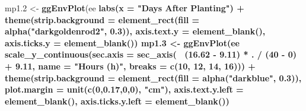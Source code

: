 \documentclass[
]{article}
\newenvironment{Shaded}{\begin{snugshade}}{\end{snugshade}}
\newcommand{\DataTypeTok}[1]{\textcolor[rgb]{0.13,0.29,0.53}{#1}}
\newcommand{\DecValTok}[1]{\textcolor[rgb]{0.00,0.00,0.81}{#1}}
\newcommand{\FloatTok}[1]{\textcolor[rgb]{0.00,0.00,0.81}{#1}}
\newcommand{\KeywordTok}[1]{\textcolor[rgb]{0.13,0.29,0.53}{\textbf{#1}}}
\newcommand{\NormalTok}[1]{#1}
\newcommand{\OperatorTok}[1]{\textcolor[rgb]{0.81,0.36,0.00}{\textbf{#1}}}
\newcommand{\StringTok}[1]{\textcolor[rgb]{0.31,0.60,0.02}{#1}}
\begin{document}
\begin{Shaded}
\begin{Highlighting}[]
{{{\NormalTok{mp1}\FloatTok{.2}\NormalTok{ <-}\StringTok{ }\KeywordTok{ggEnvPlot}\NormalTok{(ee }\OperatorTok{%
\StringTok{  }\KeywordTok{labs}\NormalTok{(}\DataTypeTok{x =} \StringTok{"Days After Planting"}\NormalTok{) }\OperatorTok{+}
\StringTok{  }\KeywordTok{theme}\NormalTok{(}\DataTypeTok{strip.background =} \KeywordTok{element_rect}\NormalTok{(}\DataTypeTok{fill =} \KeywordTok{alpha}\NormalTok{(}\StringTok{"darkgoldenrod2"}\NormalTok{, }\FloatTok{0.3}\NormalTok{)),}
        \DataTypeTok{axis.text.y =} \KeywordTok{element_blank}\NormalTok{(), }
        \DataTypeTok{axis.ticks.y =} \KeywordTok{element_blank}\NormalTok{())}
\NormalTok{mp1}\FloatTok{.3}\NormalTok{ <-}\StringTok{ }\KeywordTok{ggEnvPlot}\NormalTok{(ee }\OperatorTok{%
\StringTok{  }\KeywordTok{scale_y_continuous}\NormalTok{(}\DataTypeTok{sec.axis =} \KeywordTok{sec_axis}\NormalTok{(}\OperatorTok{~}\StringTok{ }\NormalTok{(}\FloatTok{16.62} \OperatorTok{-}\StringTok{ }\FloatTok{9.11}\NormalTok{) }\OperatorTok{*}\StringTok{ }\NormalTok{. }\OperatorTok{/}\StringTok{ }\NormalTok{(}\DecValTok{40} \OperatorTok{-}\StringTok{ }\DecValTok{0}\NormalTok{) }\OperatorTok{+}\StringTok{ }\FloatTok{9.11}\NormalTok{,}
                     \DataTypeTok{name =} \StringTok{"Hours (h)"}\NormalTok{, }\DataTypeTok{breaks =} \KeywordTok{c}\NormalTok{(}\DecValTok{10}\NormalTok{, }\DecValTok{12}\NormalTok{, }\DecValTok{14}\NormalTok{, }\DecValTok{16}\NormalTok{))) }\OperatorTok{+}
\StringTok{  }\KeywordTok{theme}\NormalTok{(}\DataTypeTok{strip.background =} \KeywordTok{element_rect}\NormalTok{(}\DataTypeTok{fill =} \KeywordTok{alpha}\NormalTok{(}\StringTok{"darkblue"}\NormalTok{, }\FloatTok{0.3}\NormalTok{)),}
        \DataTypeTok{plot.margin =} \KeywordTok{unit}\NormalTok{(}\KeywordTok{c}\NormalTok{(}\DecValTok{0}\NormalTok{,}\FloatTok{0.17}\NormalTok{,}\DecValTok{0}\NormalTok{,}\DecValTok{0}\NormalTok{), }\StringTok{"cm"}\NormalTok{),}
        \DataTypeTok{axis.text.y.left =} \KeywordTok{element_blank}\NormalTok{(),}
        \DataTypeTok{axis.ticks.y.left =} \KeywordTok{element_blank}\NormalTok{())}
}}}}}
\end{Highlighting}
\end{Shaded}
\end{document}
